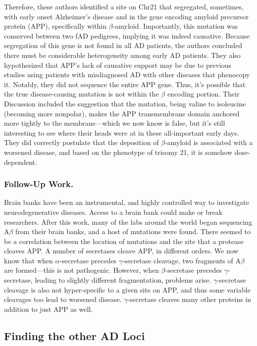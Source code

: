 Therefore, these authors identified a site on Chr21 that segregated, sometimes, with early onset Alzheimer's disease and in the gene encoding amyloid precursor protein (APP), specifically within $\beta$-amyloid. Importantly, this mutation was conserved between two fAD pedigrees, implying it was indeed causative. Because segregation of this gene is not found in all AD patients, the authors concluded there must be considerable heterogeneity among early AD patients. They also hypothesized that APP's lack of causative support may be due to previous studies using patients with misdiagnosed AD with other diseases that phenocopy it. Notably, they did not sequence the entire APP gene. Thus, it's possible that the true disease-causing mutation is not within the $\beta$ encoding portion. Their Discussion included the suggestion that the mutation, being valine to isoleucine (becoming more nonpolar), makes the APP transmembrane domain anchored more tightly to the membrane---which we now know is false, but it's still interesting to see where their heads were at in these all-important early days. They did correctly postulate that the deposition of $\beta$-amyloid is associated with a worsened disease, and based on the phenotype of trisomy 21, it is somehow dose-dependent.

\subsubsection*{Follow-Up Work.}

Brain banks have been an instrumental, and highly controlled way to investigate neurodegenerative diseases. Access to a brain bank could make or break researchers. After this work, many of the labs around the world began sequencing A$\beta$ from their brain banks, and a host of mutations were found. There seemed to be a correlation between the location of mutations and the site that a protease cleaves APP. A number of secretases cleave APP, in different orders. We now know that when $\alpha$-secretase precedes $\gamma$-secretase cleavage, two fragments of A$\beta$ are formed---this is not pathogenic. However, when $\beta$-secretase precedes $\gamma$-secretase, leading to slightly different fragmentation, problems arise. $\gamma$-secretase cleavage is also not hyper-specific to a given site on APP, and thus some variable cleavages too lead to worsened disease. $\gamma$-secretase cleaves many other proteins in addition to just APP as well.


\subsection*{Finding the other AD Loci}

